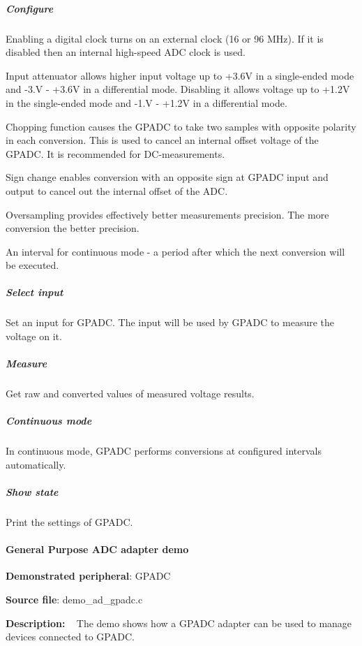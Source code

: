 \subparagraph*{Configure}


\begin{DoxyItemize}
\item Enabling a digital clock turns on an external clock (16 or 96 M\+Hz). If it is disabled then an internal high-\/speed A\+D\+C clock is used.
\item Input attenuator allows higher input voltage up to +3.6\+V in a single-\/ended mode and -\/3.\+V -\/ +3.6\+V in a differential mode. Disabling it allows voltage up to +1.2\+V in the single-\/ended mode and -\/1.\+V -\/ +1.2\+V in a differential mode.
\item Chopping function causes the G\+P\+A\+D\+C to take two samples with opposite polarity in each conversion. This is used to cancel an internal offset voltage of the G\+P\+A\+D\+C. It is recommended for D\+C-\/measurements.
\item Sign change enables conversion with an opposite sign at G\+P\+A\+D\+C input and output to cancel out the internal offset of the A\+D\+C.
\item Oversampling provides effectively better measurements precision. The more conversion the better precision.
\item An interval for continuous mode -\/ a period after which the next conversion will be executed.
\end{DoxyItemize}

\subparagraph*{Select input}

Set an input for G\+P\+A\+D\+C. The input will be used by G\+P\+A\+D\+C to measure the voltage on it.

\subparagraph*{Measure}

Get raw and converted values of measured voltage results.

\subparagraph*{Continuous mode}

In continuous mode, G\+P\+A\+D\+C performs conversions at configured intervals automatically.

\subparagraph*{Show state}

Print the settings of G\+P\+A\+D\+C.

\paragraph*{General Purpose A\+D\+C adapter demo}


\begin{DoxyItemize}
\item {\bfseries Demonstrated peripheral}\+: G\+P\+A\+D\+C
\item {\bfseries Source file}\+: demo\+\_\+ad\+\_\+gpadc.\+c
\item {\bfseries Description\+:} ~\newline
 The demo shows how a G\+P\+A\+D\+C adapter can be used to manage devices connected to G\+P\+A\+D\+C.
\end{DoxyItemize}

